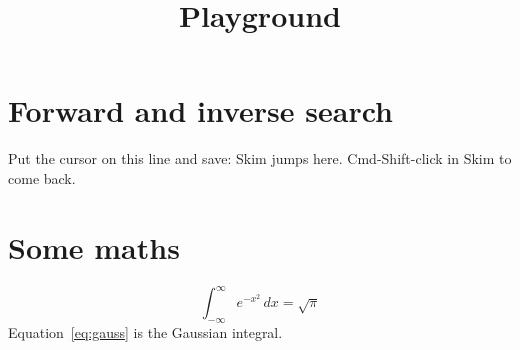 \documentclass{article}
\title{Playground}
\author{}
\begin{document}
\maketitle

\section{Forward and inverse search}
Put the cursor on this line and save: Skim jumps here.
Cmd-Shift-click in Skim to come back.

\section{Some maths}
\begin{equation}
  \int_{-\infty}^{\infty} e^{-x^2}\,dx = \sqrt{\pi}
  \label{eq:gauss}
\end{equation}
Equation~\eqref{eq:gauss} is the Gaussian integral.
\end{document}

